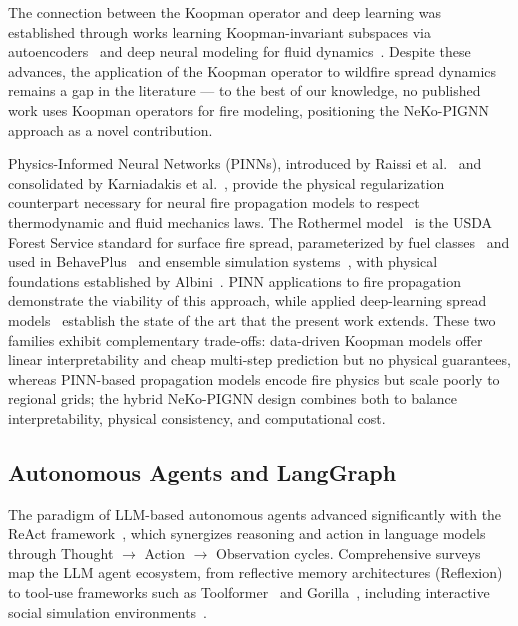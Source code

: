 \documentclass[preprint,12pt,times,numbers]{elsarticle}
\begin{document}
The connection between the Koopman operator and deep learning was established through works learning Koopman-invariant subspaces via autoencoders~\cite{article:lusch2018,article:takeishi2017} and deep neural modeling for fluid dynamics~\cite{article:morton2019}. Despite these advances, the application of the Koopman operator to wildfire spread dynamics remains a gap in the literature --- to the best of our knowledge, no published work uses Koopman operators for fire modeling, positioning the NeKo-PIGNN approach as a novel contribution.

Physics-Informed Neural Networks (PINNs), introduced by Raissi et al.~\cite{article:raissi2019} and consolidated by Karniadakis et al.~\cite{article:karniadakis2021}, provide the physical regularization counterpart necessary for neural fire propagation models to respect thermodynamic and fluid mechanics laws. The Rothermel model~\cite{article:rothermel1972} is the USDA Forest Service standard for surface fire spread, parameterized by fuel classes~\cite{article:scott2001} and used in BehavePlus~\cite{article:andrews2014} and ensemble simulation systems~\cite{article:finney2011}, with physical foundations established by Albini~\cite{article:albini1976}. PINN applications to fire propagation~\cite{article:vogiatzoglou2024,article:dabrowski2023} demonstrate the viability of this approach, while applied deep-learning spread models~\cite{article:jiang2023} establish the state of the art that the present work extends. These two families exhibit complementary trade-offs: data-driven Koopman models offer linear interpretability and cheap multi-step prediction but no physical guarantees, whereas PINN-based propagation models encode fire physics but scale poorly to regional grids; the hybrid NeKo-PIGNN design combines both to balance interpretability, physical consistency, and computational cost.

\subsection{Autonomous Agents and LangGraph}

The paradigm of LLM-based autonomous agents advanced significantly with the ReAct framework~\cite{article:react2023}, which synergizes reasoning and action in language models through Thought \(\rightarrow\) Action \(\rightarrow\) Observation cycles. Comprehensive surveys~\cite{article:xi2023,article:wang2024survey} map the LLM agent ecosystem, from reflective memory architectures (Reflexion)~\cite{article:shinn2023} to tool-use frameworks such as Toolformer~\cite{article:schick2023} and Gorilla~\cite{article:patil2023}, including interactive social simulation environments~\cite{article:park2023}.
\end{document}
